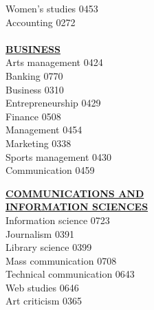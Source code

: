 \documentclass[9pt,twoside]{article}
\newcommand{\categoryheading}[1]{{\fontsize{8}{11}\selectfont \textbf{\uline{#1}}}}
\begin{document}
{\begin{multicols}{3}
Women's studies \hfill 0453 \\
Accounting \hfill 0272 \\
\columnbreak \\
\categoryheading{BUSINESS} \\
Arts management \hfill 0424 \\
Banking \hfill 0770 \\
Business \hfill 0310 \\
Entrepreneurship \hfill 0429 \\
Finance \hfill 0508 \\
Management \hfill 0454 \\
Marketing \hfill 0338 \\
Sports management \hfill 0430 \\
Communication \hfill 0459

\categoryheading{COMMUNICATIONS AND \\
INFORMATION SCIENCES} \\
Information science \hfill 0723 \\
Journalism \hfill 0391 \\
Library science \hfill 0399 \\
Mass communication \hfill 0708 \\
Technical communication \hfill 0643 \\
Web studies \hfill 0646 \\
Art criticism \hfill 0365


\end{multicols}}
\end{document}
